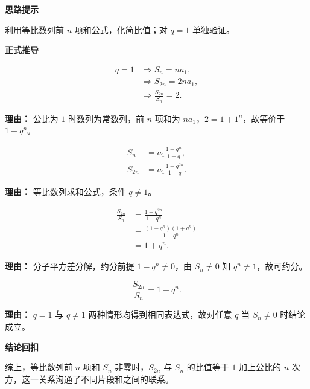\begin{proofbox}
	\textbf{\textcolor{CProof}{思路提示}}

	利用等比数列前 $n$ 项和公式，化简比值；对 $q=1$ 单独验证。

	\medskip
	\textbf{\textcolor{CProof}{正式推导}}
	\begin{description}[style=nextline, leftmargin=2.8em, labelsep=0.5em, itemsep=0.55em]
		\item[\textbf{步骤一（公比 $q=1$ 情形）：}]
			\[
				\begin{aligned}
					q=1 &\Rightarrow S_n = na_1, \\
					&\Rightarrow S_{2n} = 2na_1, \\
					&\Rightarrow \frac{S_{2n}}{S_n} = 2.
			\end{aligned}
			\]
			\par\textbf{理由：} 公比为 $1$ 时数列为常数列，前 $n$ 项和为 $na_1$，$2=1+1^n$，故等价于 $1+q^n$。

		\item[\textbf{步骤二（$q\neq 1$ 时求和公式）：}]
			\[
				\begin{aligned}
					S_n &= a_1\frac{1-q^n}{1-q}, \\
					S_{2n} &= a_1\frac{1-q^{2n}}{1-q}.
			\end{aligned}
			\]
			\par\textbf{理由：} 等比数列求和公式，条件 $q\neq 1$。

		\item[\textbf{步骤三（比值化简）：}]
			\[
				\begin{aligned}
					\frac{S_{2n}}{S_n}
					&= \frac{1-q^{2n}}{1-q^n} \\
					&= \frac{(1-q^n)(1+q^n)}{1-q^n} \\
					&= 1+q^n.
			\end{aligned}
			\]
			\par\textbf{理由：} 分子平方差分解，约分前提 $1-q^n\neq0$，由 $S_n\neq0$ 知 $q^n\neq1$，故可约分。

		\item[\textbf{步骤四（综合结论）：}]
			\[
				\frac{S_{2n}}{S_n}=1+q^n.
			\]
			\par\textbf{理由：} $q=1$ 与 $q\neq1$ 两种情形均得到相同表达式，故对任意 $q$ 当 $S_n\neq0$ 时结论成立。
	\end{description}

	\medskip
	\textbf{\textcolor{CProof}{结论回扣}}

	综上，等比数列前 $n$ 项和 $S_n$ 非零时，$S_{2n}$ 与 $S_n$ 的比值等于 $1$ 加上公比的 $n$ 次方，这一关系沟通了不同片段和之间的联系。
\end{proofbox}
